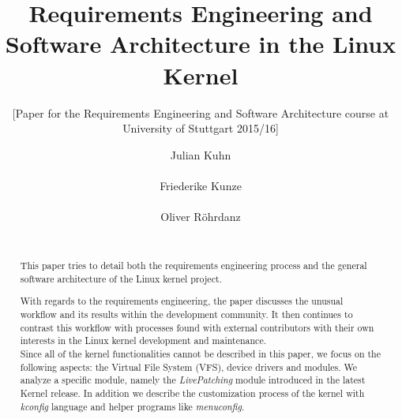 \documentclass{sig-alternate-05-2015}
\begin{document}
\title{Requirements Engineering and Software Architecture in the Linux Kernel}
\subtitle{[Paper for the Requirements Engineering and Software Architecture course at University of Stuttgart 2015/16]}

\author{
    \alignauthor Julian Kuhn\\
        \\
    \alignauthor Friederike Kunze\\
        \\
    \alignauthor Oliver R{\"o}hrdanz\\
        \\
}

\maketitle

\begin{abstract}

This paper tries to detail both the requirements engineering process and the general software architecture of the Linux kernel project.

With regards to the requirements engineering, the paper discusses the unusual workflow and its results within the development community.
It then continues to contrast this workflow with processes found with external contributors with their own interests in the Linux kernel development and maintenance.\\
Since all of the kernel functionalities cannot be described in this paper, we focus on the following aspects: the Virtual File System (VFS), device drivers and modules. We analyze a specific module, namely the \emph{LivePatching} module introduced in the latest Kernel release. In addition we describe the customization process of the kernel with \emph{kconfig} language and helper programs like \emph{menuconfig}.



\end{abstract}
\end{document}
